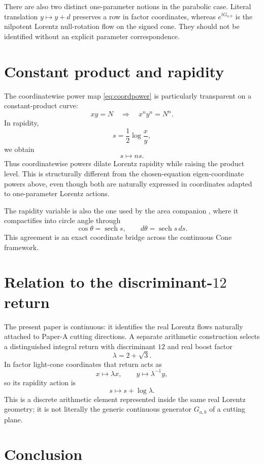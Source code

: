 \documentclass[11pt]{amsart}
\theoremstyle{remark}
\begin{document}
There are also two distinct one-parameter notions in the parabolic case.  Literal translation $y\mapsto y+d$ preserves a row in factor coordinates, whereas $e^{tG_{a,0}}$ is the nilpotent Lorentz null-rotation flow on the signed cone.  They should not be identified without an explicit parameter correspondence.

\section{Constant product and rapidity}

The coordinatewise power map \eqref{eq:coordpower} is particularly transparent on a constant-product curve:
\[
xy=N
\quad\Longrightarrow\quad
x^ny^n=N^n.
\]
In rapidity,
\[
s=\frac12\log\frac{x}{y},
\]
we obtain
\begin{equation}\label{eq:rapiditypower}
\boxed{s\mapsto ns.}
\end{equation}
Thus coordinatewise powers dilate Lorentz rapidity while raising the product level.  This is structurally different from the chosen-equation eigen-coordinate powers above, even though both are naturally expressed in coordinates adapted to one-parameter Lorentz actions.

The rapidity variable is also the one used by the area companion \cite{Ebert2026Area}, where it compactifies into circle angle through
\[
\cos\theta=\operatorname{sech}s,
\qquad
d\theta=\operatorname{sech}s\,ds.
\]
This agreement is an exact coordinate bridge across the continuous Cone framework.

\section{Relation to the discriminant-$12$ return}

The present paper is continuous: it identifies the real Lorentz flows naturally attached to Paper-A cutting directions.  A separate arithmetic construction \cite{Ebert2026D12} selects a distinguished integral return with discriminant $12$ and real boost factor
\[
\lambda=2+\sqrt3.
\]
In factor light-cone coordinates that return acts as
\[
x\mapsto\lambda x,
\qquad
y\mapsto\lambda^{-1}y,
\]
so its rapidity action is
\[
s\mapsto s+\log\lambda.
\]
This is a discrete arithmetic element represented inside the same real Lorentz geometry; it is not literally the generic continuous generator $G_{a,b}$ of a cutting plane.

\section{Conclusion}
\end{document}
